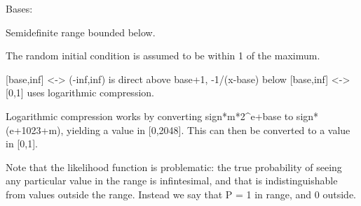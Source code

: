 \documentclass[letterpaper,10pt,english]{sphinxmanual}
\begin{document}
\begin{fulllineitems}
\label{api/mystic.bounds:refl1d.mystic.bounds.BoundedBelow}
Bases: 

Semidefinite range bounded below.

The random initial condition is assumed to be within 1 of the maximum.

{[}base,inf{]} \textless{}-\textgreater{} (-inf,inf) is direct above base+1, -1/(x-base) below
{[}base,inf{]} \textless{}-\textgreater{} {[}0,1{]} uses logarithmic compression.

Logarithmic compression works by converting sign*m*2\textasciicircum{}e+base to
sign*(e+1023+m), yielding a value in {[}0,2048{]}. This can then be
converted to a value in {[}0,1{]}.

Note that the likelihood function is problematic: the true probability
of seeing any particular value in the range is infintesimal, and that
is indistinguishable from values outside the range.    Instead we say
that P = 1 in range, and 0 outside.

\begin{fulllineitems}
\label{api/mystic.bounds:refl1d.mystic.bounds.BoundedBelow.get01}
\end{fulllineitems}


\begin{fulllineitems}
\label{api/mystic.bounds:refl1d.mystic.bounds.BoundedBelow.getfull}
\end{fulllineitems}


\begin{fulllineitems}
\label{api/mystic.bounds:refl1d.mystic.bounds.BoundedBelow.nllf}
\end{fulllineitems}


\begin{fulllineitems}
\label{api/mystic.bounds:refl1d.mystic.bounds.BoundedBelow.put01}
\end{fulllineitems}


\end{fulllineitems}
\end{document}
